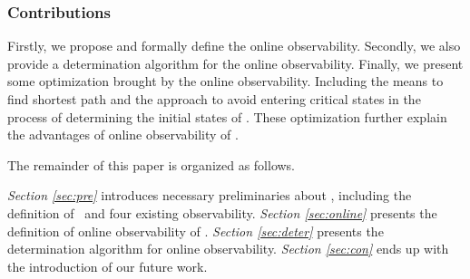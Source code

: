\subsubsection*{Contributions}
Firstly, we propose and formally define the online observability. %
Secondly, we also provide a determination algorithm for the online observability. Finally, we present some optimization brought by the online observability. Including the means to find shortest path and the approach to avoid entering critical states in the process of determining the initial states of \BCNs.  These optimization further explain the advantages of online observability of \BCNs. 

The remainder of this paper is organized as follows.

 {\em Section \ref{sec:pre}} introduces necessary preliminaries about \BCNs, including the definition of \BCNs\ and four existing observability. {\em Section \ref{sec:online}} presents the definition of online observability of \BCNs. {\em Section \ref{sec:deter}} presents the determination algorithm for online observability. 
 {\em Section \ref{sec:con}} ends up with the introduction of our future work.

